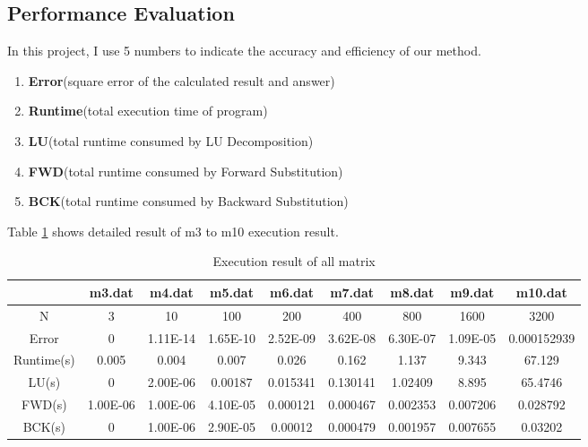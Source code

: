 \documentclass{article}
\begin{document}
\subsection{Performance Evaluation}
In this project, I use 5 numbers to indicate the accuracy and efficiency of our method.
\begin{enumerate}
    \item \textbf{Error}(square error of the calculated result and answer)
    \item \textbf{Runtime}(total execution time of program)
    \item \textbf{LU}(total runtime consumed by LU Decomposition)
    \item \textbf{FWD}(total runtime consumed by Forward Substitution)
    \item \textbf{BCK}(total runtime consumed by Backward Substitution)
\end{enumerate}
Table \ref{tab:record} shows detailed result of m3 to m10 execution result.
\begin{table}[htbp]
  \centering
  \caption{Execution result of all matrix}
    \begin{tabular}{|c|c|c|c|c|c|c|c|c|}
    \hline
        & m3.dat & m4.dat & m5.dat & m6.dat & m7.dat & m8.dat & m9.dat & m10.dat \bigstrut\\
    \hline
    N   & 3   & 10  & 100 & 200 & 400 & 800 & 1600 & 3200 \bigstrut\\
    \hline
    Error & 0   & 1.11E-14 & 1.65E-10 & 2.52E-09 & 3.62E-08 & 6.30E-07 & 1.09E-05 & 0.000152939 \bigstrut\\
    \hline
    Runtime(s) & 0.005 & 0.004 & 0.007 & 0.026 & 0.162 & 1.137 & 9.343 & 67.129 \bigstrut\\
    \hline
    LU(s) & 0   & 2.00E-06 & 0.00187 & 0.015341 & 0.130141 & 1.02409 & 8.895 & 65.4746 \bigstrut\\
    \hline
    FWD(s) & 1.00E-06 & 1.00E-06 & 4.10E-05 & 0.000121 & 0.000467 & 0.002353 & 0.007206 & 0.028792 \bigstrut\\
    \hline
    BCK(s) & 0   & 1.00E-06 & 2.90E-05 & 0.00012 & 0.000479 & 0.001957 & 0.007655 & 0.03202 \bigstrut\\
    \hline
    \end{tabular}%
  \label{tab:record}%
\end{table}%
\end{document}
